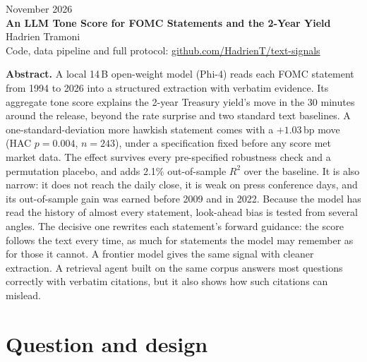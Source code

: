 \documentclass[11pt,a4paper]{article}
\newcommand{\sfb}[1]{{\sffamily\bfseries #1}}
\newcommand{\bp}{\,bp}
\begin{document}
\thispagestyle{first}

\begin{flushleft}
{\sffamily\small\color{muted} November 2026}\\[0.6em]
{\sffamily\bfseries\LARGE\color{accent} An LLM Tone Score for FOMC Statements and the 2-Year Yield}\\[0.7em]
{\normalsize Hadrien Tramoni}\\[0.2em]
{\small\color{muted} Code, data pipeline and full protocol:
\href{https://github.com/HadrienT/text-signals}{github.com/HadrienT/text-signals}}
\end{flushleft}

\vspace{0.4em}
\noindent\colorbox{accent!6}{\parbox{\dimexpr\textwidth-2\fboxsep}{\small
\sfb{Abstract.}
A local 14\,B open-weight model (Phi-4) reads each FOMC statement from 1994 to 2026 into a
structured extraction with verbatim evidence. Its aggregate tone score explains the 2-year
Treasury yield's move in the 30 minutes around the release, beyond the rate surprise and two
standard text baselines. A one-standard-deviation more hawkish statement comes with a
$+1.03$\bp{} move (HAC $p = 0.004$, $n = 243$), under a specification fixed before any score
met market data. The effect survives every pre-specified robustness check and a permutation
placebo, and adds 2.1\% out-of-sample $R^2$ over the baseline. It is also narrow: it does not
reach the daily close, it is weak on press conference days, and its out-of-sample gain was
earned before 2009 and in 2022. Because the model has read the history of almost every
statement, look-ahead bias is tested from several angles. The decisive one rewrites each
statement's forward guidance: the score follows the text every time, as much for statements
the model may remember as for those it cannot. A frontier model gives the same signal with
cleaner extraction. A retrieval agent built on the same corpus answers most questions
correctly with verbatim citations, but it also shows how such citations can mislead.}}

\vspace{0.6em}

\section{Question and design}
\end{document}
